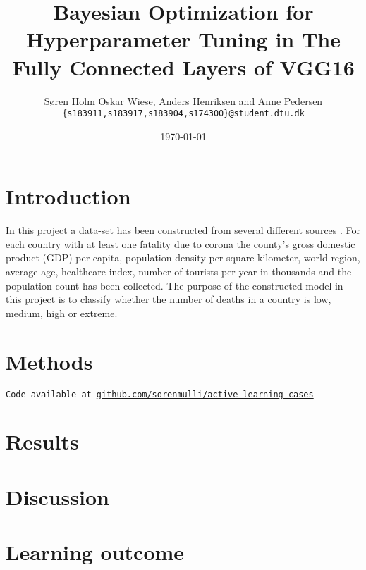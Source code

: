 \documentclass[12pt,fleqn]{article}
\title{\vspace*{-3.75cm}Bayesian Optimization for Hyperparameter Tuning in The Fully Connected Layers of VGG16}
\author{Søren Holm Oskar Wiese, Anders Henriksen and Anne Pedersen \\
	\small {\texttt{\{s183911,s183917,s183904,s174300\}@student.dtu.dk}}}
\date{\today}
\begin{document}
	
	\maketitle
	
	
	\begin{abstract}
		
	\end{abstract}
	
		
		
		\section{Introduction} 
		
		In this project a data-set has been constructed from several different sources \cite{density, corona, alder, bnp, region, healthcare, turist}. For each country with at least one fatality due to corona the county's gross domestic product (GDP) per capita, population density per square kilometer, world region, average age, healthcare index, number of tourists per year in thousands and the population count has been collected. The purpose of the constructed model in this project is to classify whether the number of deaths in a country is low, medium, high or extreme.

		\section{Methods}
			
			\texttt{Code available at \url{github.com/sorenmulli/active_learning_cases}}
		

	\section{Results}
		

		\section{Discussion}
			
		\section{Learning outcome}
			
\end{document}
